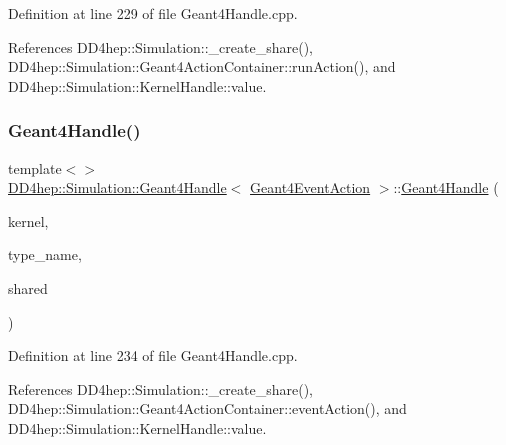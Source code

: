 Definition at line 229 of file Geant4\+Handle.\+cpp.



References D\+D4hep\+::\+Simulation\+::\+\_\+create\+\_\+share(), D\+D4hep\+::\+Simulation\+::\+Geant4\+Action\+Container\+::run\+Action(), and D\+D4hep\+::\+Simulation\+::\+Kernel\+Handle\+::value.

\hypertarget{class_d_d4hep_1_1_simulation_1_1_geant4_handle_a83ceb2c01f0058d6e8704630ed7be49a}{}\label{class_d_d4hep_1_1_simulation_1_1_geant4_handle_a83ceb2c01f0058d6e8704630ed7be49a} 
\subsubsection{\texorpdfstring{Geant4\+Handle()}{Geant4Handle()}\hspace{0.1cm}{\footnotesize\ttfamily [10/20]}}
{\footnotesize\ttfamily template$<$$>$ \\
\hyperlink{class_d_d4hep_1_1_simulation_1_1_geant4_handle}{D\+D4hep\+::\+Simulation\+::\+Geant4\+Handle}$<$ \hyperlink{class_d_d4hep_1_1_simulation_1_1_geant4_event_action}{Geant4\+Event\+Action} $>$\+::\hyperlink{class_d_d4hep_1_1_simulation_1_1_geant4_handle}{Geant4\+Handle} (\begin{DoxyParamCaption}\item[{\hyperlink{class_d_d4hep_1_1_simulation_1_1_geant4_kernel}{Geant4\+Kernel} \&}]{kernel,  }\item[{const string \&}]{type\+\_\+name,  }\item[{bool}]{shared }\end{DoxyParamCaption})}



Definition at line 234 of file Geant4\+Handle.\+cpp.



References D\+D4hep\+::\+Simulation\+::\+\_\+create\+\_\+share(), D\+D4hep\+::\+Simulation\+::\+Geant4\+Action\+Container\+::event\+Action(), and D\+D4hep\+::\+Simulation\+::\+Kernel\+Handle\+::value.

\hypertarget{class_d_d4hep_1_1_simulation_1_1_geant4_handle_af0321737386265d173b882fe1403f4b8}{}\label{class_d_d4hep_1_1_simulation_1_1_geant4_handle_af0321737386265d173b882fe1403f4b8} 
